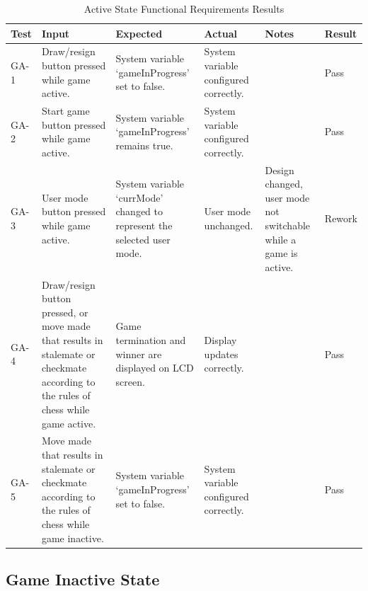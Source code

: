 \documentclass[12pt, titlepage]{article}
\begin{document}
\begin{table}[H]
    \centering
        \setlength{\leftmargini}{0cm}
        \begin{tabular}{| >{\centering\arraybackslash}m{1cm} | 
            >{\centering\arraybackslash}m{2.5cm} | 
            >{\centering\arraybackslash}m{4cm} | 
            >{\centering\arraybackslash}m{3cm} |
            >{\centering\arraybackslash}m{3cm} |
            >{\centering\arraybackslash}m{1.5cm} |}
        \hline
        \rowcolor[gray]{0.9}
        Test & Input & Expected & Actual & Notes & Result\\
        \hline
        GA-1 & Draw/resign button pressed while game active. & System variable `gameInProgress' set to false. &  System variable configured correctly. &  & Pass \\
        \hline
        GA-2 & Start game button pressed while game active. & System variable `gameInProgress' remains true. &  System variable configured correctly. &  & Pass \\
        \hline
        GA-3 & User mode button pressed while game active. & System variable `currMode' changed to represent the selected user mode. &  User mode unchanged. & Design changed, user mode not switchable while a game is active. & Rework \\
        \hline
        GA-4 & Draw/resign button pressed, or move made that results in stalemate or checkmate according to the rules of chess while game active. & Game termination and winner are displayed on LCD screen. & Display updates correctly. &  & Pass \\
        \hline
        GA-5 & Move made that results in stalemate or checkmate according to the rules of chess while game inactive. & System variable `gameInProgress' set to false. &  System variable configured correctly. &  & Pass \\ 
        \hline
        \end{tabular}
    \caption{Active State Functional Requirements Results}
\end{table}

\subsection{Game Inactive State}
\end{document}

